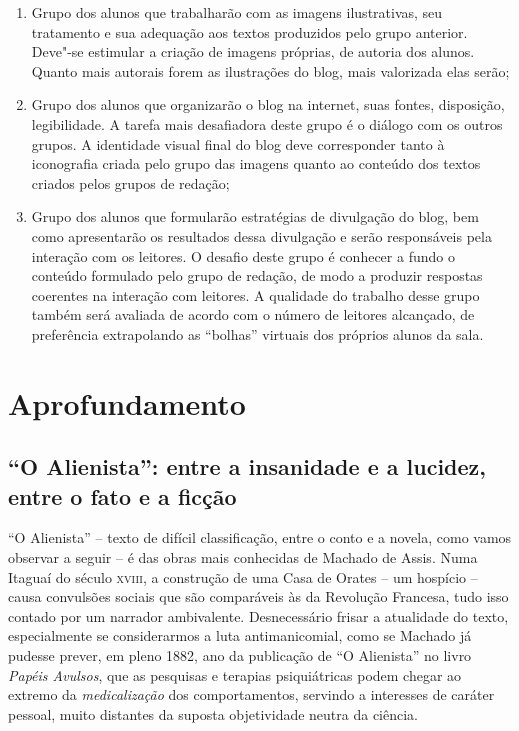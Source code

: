 \documentclass{extarticle}
\begin{document}
\begin{enumerate}
\begin{enumerate}
\item Grupo dos alunos que trabalharão com as imagens ilustrativas, seu
tratamento e sua adequação aos textos produzidos pelo grupo anterior.
Deve"-se estimular a criação de imagens próprias, de autoria dos alunos.
Quanto mais autorais forem as ilustrações do blog, mais valorizada elas
serão;

\item Grupo dos alunos que organizarão o blog na internet, suas fontes,
disposição, legibilidade. A tarefa mais desafiadora deste grupo é o
diálogo com os outros grupos. A identidade visual final do blog deve
corresponder tanto à iconografia criada pelo grupo das imagens quanto ao
conteúdo dos textos criados pelos grupos de redação;

\item Grupo dos alunos que formularão estratégias de divulgação do blog,
bem como apresentarão os resultados dessa divulgação e serão
responsáveis pela interação com os leitores. O desafio deste grupo é
conhecer a fundo o conteúdo formulado pelo grupo de redação, de modo a
produzir respostas coerentes na interação com leitores. A qualidade do
trabalho desse grupo também será avaliada de acordo com o número de
leitores alcançado, de preferência extrapolando as ``bolhas'' virtuais
dos próprios alunos da sala.
\end{enumerate}
\end{enumerate}

\section{Aprofundamento}

\subsection{``O Alienista'': entre a insanidade e a lucidez, entre o fato e a ficção}

``O Alienista'' -- texto de difícil classificação, entre o conto e a
novela, como vamos observar a seguir -- é das obras mais conhecidas de
Machado de Assis. Numa Itaguaí do século \textsc{xviii}, a construção de uma Casa
de Orates -- um hospício -- causa convulsões sociais que são comparáveis
às da Revolução Francesa, tudo isso contado por um narrador ambivalente.
Desnecessário frisar a atualidade do texto, especialmente se
considerarmos a luta antimanicomial, como se Machado já pudesse prever,
em pleno 1882, ano da publicação de ``O Alienista'' no livro
\emph{Papéis Avulsos}, que as pesquisas e terapias psiquiátricas podem
chegar ao extremo da \emph{medicalização} dos comportamentos, servindo a
interesses de caráter pessoal, muito distantes da suposta objetividade
neutra da ciência.
\end{document}
